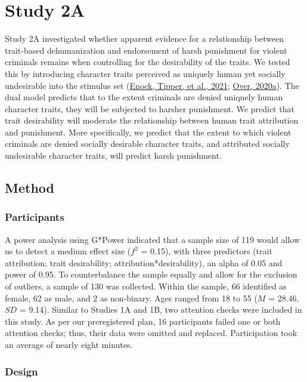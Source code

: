 \documentclass[
]{article}
\begin{document}
\hypertarget{study-2a}{%
\section{Study 2A}\label{study-2a}}

Study 2A investigated whether apparent evidence for a relationship between trait-based dehumanization and endorsement of harsh punishment for violent criminals remains when controlling for the desirability of the traits. We tested this by introducing character traits perceived as uniquely human yet socially undesirable into the stimulus set (\protect\hyperlink{ref-Enock2021a}{Enock, Tipper, et al., 2021}; \protect\hyperlink{ref-Over2020a}{Over, 2020a}). The dual model predicts that to the extent criminals are denied uniquely human character traits, they will be subjected to harsher punishment. We predict that trait desirability will moderate the relationship between human trait attribution and punishment. More specifically, we predict that the extent to which violent criminals are denied socially desirable character traits, and attributed socially undesirable character traits, will predict harsh punishment.

\hypertarget{method-1}{%
\subsection{Method}\label{method-1}}

\hypertarget{participants-2}{%
\subsubsection{Participants}\label{participants-2}}

A power analysis using G*Power indicated that a sample size of 119 would allow us to detect a medium effect size (\(f^2\) = 0.15), with three predictors (trait attribution; trait desirability; attribution*desirability), an alpha of 0.05 and power of 0.95. To counterbalance the sample equally and allow for the exclusion of outliers, a sample of 130 was collected. Within the sample, 66 identified as female, 62 as male, and 2 as non-binary. Ages ranged from 18 to 55 (\(M\) = 28.46, \(SD\) = 9.14). Similar to Studies 1A and 1B, two attention checks were included in this study. As per our preregistered plan, 16 participants failed one or both attention checks; thus, their data were omitted and replaced. Participation took an average of nearly eight minutes.

\hypertarget{design-1}{%
\subsubsection{Design}\label{design-1}}
\end{document}
